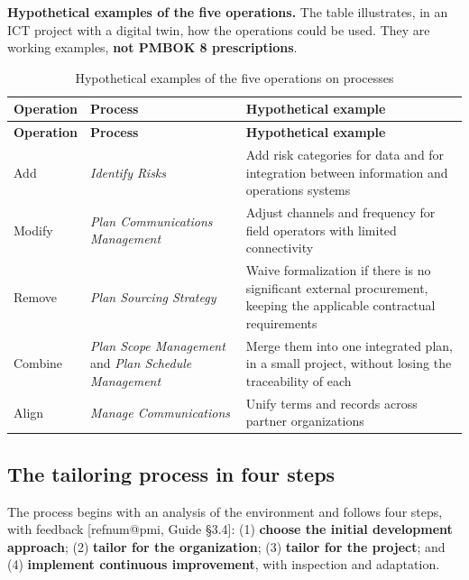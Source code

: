 \documentclass[12pt,a4paper,article,oneside,brazil,english]{abntex2}
\makeatletter
\newcommand{\fontetab}[1]{\par\vspace{3pt}{\small\noindent Source: #1\par}}
\newcommand{\refnum}[1]{\csname refnum@#1\endcsname}
\makeatother
\begin{document}
\textbf{Hypothetical examples of the five operations.} The table illustrates, in an ICT project with a digital twin, how the operations could be used. They are working examples, \textbf{not PMBOK 8 prescriptions}.

\begingroup\SingleSpacing\small
\begin{longtable}{@{}>{\raggedright\arraybackslash}p{}>{\raggedright\arraybackslash}p{}>{\raggedright\arraybackslash}p{}@{}}
\caption{Hypothetical examples of the five operations on processes}\label{tab:t10}\\
\hline
\textbf{Operation} & \textbf{Process} & \textbf{Hypothetical example}\\
\hline
\endfirsthead
\hline
\textbf{Operation} & \textbf{Process} & \textbf{Hypothetical example}\\
\hline
\endhead
\hline
\endfoot
\hline
\endlastfoot
Add & \textit{Identify Risks} & Add risk categories for data and for integration between information and operations systems\\[3pt]
Modify & \textit{Plan Communications Management} & Adjust channels and frequency for field operators with limited connectivity\\[3pt]
Remove & \textit{Plan Sourcing Strategy} & Waive formalization if there is no significant external procurement, keeping the applicable contractual requirements\\[3pt]
Combine & \textit{Plan Scope Management} and \textit{Plan Schedule Management} & Merge them into one integrated plan, in a small project, without losing the traceability of each\\[3pt]
Align & \textit{Manage Communications} & Unify terms and records across partner organizations\\[3pt]
\end{longtable}
\endgroup
\fontetab{Prepared by the authors (2026); illustrative examples, not PMBOK 8 prescriptions.}
\subsection{The tailoring process in four steps}

The process begins with an analysis of the environment and follows four steps, with feedback [\refnum{pmi}, Guide §3.4]: (1) \textbf{choose the initial development approach}; (2) \textbf{tailor for the organization}; (3) \textbf{tailor for the project}; and (4) \textbf{implement continuous improvement}, with inspection and adaptation.
\end{document}
